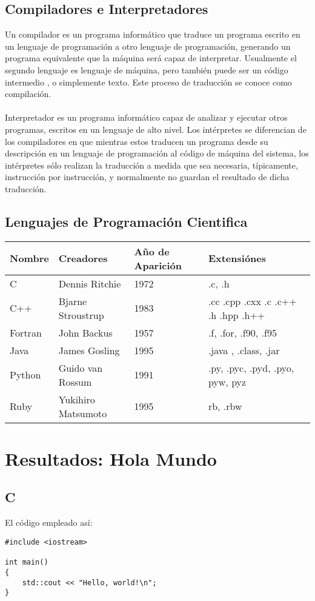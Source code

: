 \documentclass{article}
\begin{document}
\subsection{Compiladores e Interpretadores}
Un compilador es un programa informático que traduce un programa escrito en un lenguaje de programación a otro lenguaje de programación, generando un programa equivalente que la máquina será capaz de interpretar. Usualmente el segundo lenguaje es lenguaje de máquina, pero también puede ser un código intermedio , o simplemente texto. Este proceso de traducción se conoce como compilación.\\
\\
Interpretador es un programa informático capaz de analizar y ejecutar otros programas, escritos en un lenguaje de alto nivel. Los intérpretes se diferencian de los compiladores en que mientras estos traducen un programa desde su descripción en un lenguaje de programación al código de máquina del sistema, los intérpretes sólo realizan la traducción a medida que sea necesaria, típicamente, instrucción por instrucción, y normalmente no guardan el resultado de dicha traducción.

\subsection{Lenguajes de Programación Cientifica}

\begin{tabular}{ |l|l|l|l| }
\hline
Nombre & Creadores & Año de Aparición & Extensiónes  \\
\hline
C & Dennis Ritchie & 1972 & .c, .h  \\
C++ &  Bjarne Stroustrup & 1983 & .cc .cpp .cxx .c .c++ .h .hpp .h++  \\
Fortran & John Backus & 1957 & .f, .for, .f90, .f95 \\
Java & James Gosling & 1995 & .java , .class, .jar \\
Python  & Guido van Rossum & 1991 & .py, .pyc, .pyd, .pyo, pyw, pyz \\
Ruby & Yukihiro Matsumoto & 1995 & rb, .rbw \\
\hline
\end{tabular}

\section{Resultados: Hola Mundo}
\subsection{C}
El código empleado así:
\begin{verbatim}
#include <iostream>

int main()
{
    std::cout << "Hello, world!\n";
}
\end{verbatim}
\end{document}
